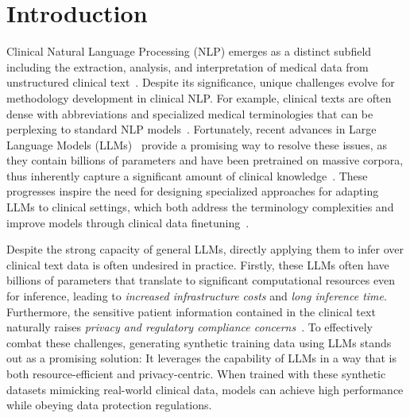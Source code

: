 
\vspace{-1ex}
\section{Introduction}
\vspace{-1ex}
\label{sec:intro}
Clinical Natural Language Processing (NLP) emerges as a distinct subfield including the extraction, analysis, and interpretation of medical data from unstructured clinical text~\citep{wornow2023shaky}.  
Despite its significance, unique challenges evolve for methodology development in clinical NLP. For example, clinical texts are often dense with abbreviations and specialized medical terminologies that can be perplexing to standard NLP models~\citep{cui2022can,lee2023ai}. 
Fortunately, recent advances in Large Language Models (LLMs)~\citep{brown2020language,chung2022scaling,ouyang2022training,chatgpt,gpt4} provide a promising way to resolve these issues, as they contain billions of parameters and have been pretrained on massive corpora, thus inherently capture a significant amount of clinical knowledge~\citep{agrawal2022large,nori2023capabilities,pmlr-v209-eric23a,wong2023scaling,singhal2022large,singhal2023towards,luo2022biogpt,shi2023retrieval,liu2023radiology}.  
These progresses inspire the need for designing specialized approaches for adapting LLMs to clinical settings, which both address the terminology complexities and improve models through clinical data finetuning~\citep{tu2023towards,liu2023utility}.



Despite the strong capacity of general LLMs, 
directly applying them to infer over clinical text data is often undesired in practice. 
Firstly, these LLMs often have billions of parameters that translate to significant computational resources even for inference, leading to \emph{increased infrastructure costs} and \emph{long inference time}. 
Furthermore, the sensitive patient information contained in the clinical text naturally raises \emph{privacy and regulatory compliance concerns}~\citep{mesko2023imperative,keeling2023algorithmic}. 
To effectively combat these challenges, generating synthetic training data using LLMs stands out as a promising solution: 
It leverages the capability of LLMs in a way that is both resource-efficient and privacy-centric. When trained with these synthetic datasets mimicking real-world clinical data, models can achieve high performance while obeying data protection regulations.

